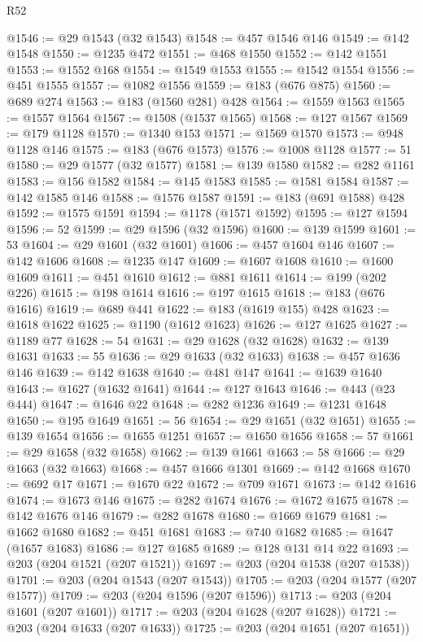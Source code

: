 \begin{lexlean}{R52}
\begin{coremodule}
@1546 := @29 @1543 (@32 @1543)
@1548 := @457 @1546 @146
@1549 := @142 @1548
@1550 := @1235 @472
@1551 := @468 @1550
@1552 := @142 @1551
@1553 := @1552 @168
@1554 := @1549 @1553
@1555 := @1542 @1554
@1556 := @451 @1555
@1557 := @1082 @1556
@1559 := @183 (@676 @875)
@1560 := @689 @274
@1563 := @183 (@1560 @281) @428
@1564 := @1559 @1563
@1565 := @1557 @1564
@1567 := @1508 (@1537 @1565)
@1568 := @127 @1567
@1569 := @179 @1128
@1570 := @1340 @153
@1571 := @1569 @1570
@1573 := @948 @1128 @146
@1575 := @183 (@676 @1573)
@1576 := @1008 @1128
@1577 := 51
@1580 := @29 @1577 (@32 @1577)
@1581 := @139 @1580
@1582 := @282 @1161
@1583 := @156 @1582
@1584 := @145 @1583
@1585 := @1581 @1584
@1587 := @142 @1585 @146
@1588 := @1576 @1587
@1591 := @183 (@691 @1588) @428
@1592 := @1575 @1591
@1594 := @1178 (@1571 @1592)
@1595 := @127 @1594
@1596 := 52
@1599 := @29 @1596 (@32 @1596)
@1600 := @139 @1599
@1601 := 53
@1604 := @29 @1601 (@32 @1601)
@1606 := @457 @1604 @146
@1607 := @142 @1606
@1608 := @1235 @147
@1609 := @1607 @1608
@1610 := @1600 @1609
@1611 := @451 @1610
@1612 := @881 @1611
@1614 := @199 (@202 @226)
@1615 := @198 @1614
@1616 := @197 @1615
@1618 := @183 (@676 @1616)
@1619 := @689 @441
@1622 := @183 (@1619 @155) @428
@1623 := @1618 @1622
@1625 := @1190 (@1612 @1623)
@1626 := @127 @1625
@1627 := @1189 @77
@1628 := 54
@1631 := @29 @1628 (@32 @1628)
@1632 := @139 @1631
@1633 := 55
@1636 := @29 @1633 (@32 @1633)
@1638 := @457 @1636 @146
@1639 := @142 @1638
@1640 := @481 @147
@1641 := @1639 @1640
@1643 := @1627 (@1632 @1641)
@1644 := @127 @1643
@1646 := @443 (@23 @444)
@1647 := @1646 @22
@1648 := @282 @1236
@1649 := @1231 @1648
@1650 := @195 @1649
@1651 := 56
@1654 := @29 @1651 (@32 @1651)
@1655 := @139 @1654
@1656 := @1655 @1251
@1657 := @1650 @1656
@1658 := 57
@1661 := @29 @1658 (@32 @1658)
@1662 := @139 @1661
@1663 := 58
@1666 := @29 @1663 (@32 @1663)
@1668 := @457 @1666 @1301
@1669 := @142 @1668
@1670 := @692 @17
@1671 := @1670 @22
@1672 := @709 @1671
@1673 := @142 @1616
@1674 := @1673 @146
@1675 := @282 @1674
@1676 := @1672 @1675
@1678 := @142 @1676 @146
@1679 := @282 @1678
@1680 := @1669 @1679
@1681 := @1662 @1680
@1682 := @451 @1681
@1683 := @740 @1682
@1685 := @1647 (@1657 @1683)
@1686 := @127 @1685
@1689 := @128 @131 @14 @22
@1693 := @203 (@204 @1521 (@207 @1521))
@1697 := @203 (@204 @1538 (@207 @1538))
@1701 := @203 (@204 @1543 (@207 @1543))
@1705 := @203 (@204 @1577 (@207 @1577))
@1709 := @203 (@204 @1596 (@207 @1596))
@1713 := @203 (@204 @1601 (@207 @1601))
@1717 := @203 (@204 @1628 (@207 @1628))
@1721 := @203 (@204 @1633 (@207 @1633))
@1725 := @203 (@204 @1651 (@207 @1651))

\end{coremodule}
\end{lexlean}
